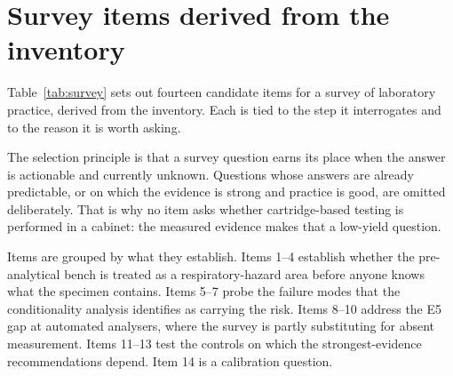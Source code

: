 \section{Survey items derived from the inventory}
\label{sec:survey}

Table~\ref{tab:survey} sets out fourteen candidate items for a survey of
laboratory practice, derived from the inventory. Each is tied to the step it
interrogates and to the reason it is worth asking.

The selection principle is that a survey question earns its place when the
answer is actionable and currently unknown. Questions whose answers are
already predictable, or on which the evidence is strong and practice is
good, are omitted deliberately. That is why no item asks whether cartridge-based
testing is performed in a cabinet: the measured evidence makes that a low-yield
question.

Items are grouped by what they establish. Items 1--4 establish whether the
pre-analytical bench is treated as a respiratory-hazard area before anyone
knows what the specimen contains. Items 5--7 probe the failure modes that the
conditionality analysis identifies as carrying the risk. Items 8--10 address
the E5 gap at automated analysers, where the survey is partly substituting for
absent measurement. Items 11--13 test the controls on which the
strongest-evidence recommendations depend. Item 14 is a calibration question.

